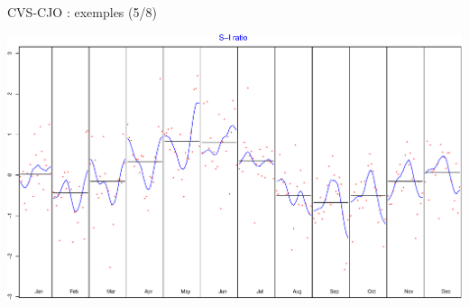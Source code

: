 \documentclass[10pt,xcolor=table,color={dvipsnames,usenames},ignorenonframetext,usepdftitle=false,french]{beamer}
\newenvironment{Shaded}{\begin{snugshade}}{\end{snugshade}}
\newcommand{\KeywordTok}[1]{\textcolor[rgb]{0.13,0.29,0.53}{\textbf{#1}}}
\newcommand{\NormalTok}[1]{#1}
\newcommand{\OperatorTok}[1]{\textcolor[rgb]{0.81,0.36,0.00}{\textbf{#1}}}
\begin{document}
\begin{frame}[fragile]{CVS-CJO : exemples (5/8)}
\protect\hypertarget{cvs-cjo-exemples-58}{}

\begin{Shaded}
\end{Shaded}

\includegraphics{Diapos/1 - R et JDemetra+_files/figure-beamer/unnamed-chunk-17-1.pdf}

\end{frame}
\end{document}
